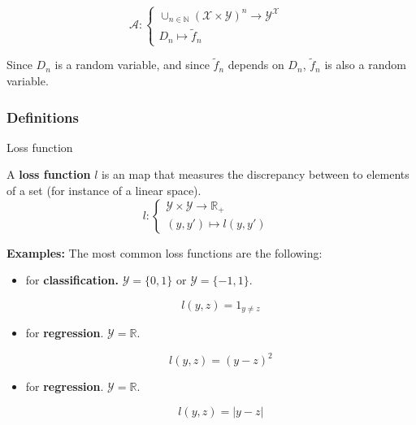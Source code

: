 \documentclass[
10pt, %
a4paper, %
oneside, %
headinclude,footinclude, %
BCOR5mm, %
]{scrartcl}
\begin{document}
$$
\mathcal{A}  : \left\{
    \begin{array}{ll}
	\cup_{n\in \mathbb{N} } ( \mathcal{X} \times \mathcal{Y} )^n\rightarrow \mathcal{Y}^{ \mathcal{X} } & \\
        D_n \mapsto \tilde{f}_n& 
    \end{array}
\right.
$$

Since $D_n$ is a random variable, and since $ \tilde{f}_n$ depends on $D_n$, $ \tilde{f}_n$ is also a random variable.

\subsubsection{\large\color{Periwinkle}Definitions}

\begin{definition}{Loss function}

    A \textbf{{loss function}} $l$ is an map that measures the discrepancy between to elements of a set (for instance of a linear space).
$$
l: \left\{
    \begin{array}{ll}
	\mathcal{Y} \times \mathcal{Y} \rightarrow \mathbb{R}_+ & \\
	(y,y') \mapsto l(y,y')& 
    \end{array}
\right.
$$

\end{definition}

\textbf{{Examples:}} The most common loss functions are the following:
\begin{itemize}
    \item["0-1" loss] for \textbf{{classification.}} $ \mathcal{Y}  = \{0, 1\}$ or $ \mathcal{Y}  = \{-1, 1\}$.

	\begin{equation}
	    l(y,z) = 1_{y\neq z}
	\end{equation}
    \item[square loss] for \textbf{{regression}}. $ \mathcal{Y}  = \mathbb{R} $. 

	\begin{equation}
	    l(y,z) = (y-z)^2
	\end{equation}
    \item[absolute loss] for \textbf{{regression}}. $ \mathcal{Y}  = \mathbb{R} $. 

	\begin{equation}
	    l(y,z) = |y-z|
	\end{equation}
\end{itemize}
\end{document}
